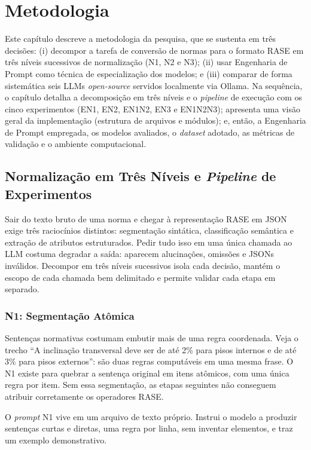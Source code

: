 \chapter{Metodologia}

Este capítulo descreve a metodologia da pesquisa, que se sustenta em três decisões: (i) decompor a tarefa de conversão de normas para o formato RASE em três níveis sucessivos de normalização (N1, N2 e N3); (ii) usar Engenharia de Prompt como técnica de especialização dos modelos; e (iii) comparar de forma sistemática seis LLMs \textit{open-source} servidos localmente via Ollama. Na sequência, o capítulo detalha a decomposição em três níveis e o \textit{pipeline} de execução com os cinco experimentos (EN1, EN2, EN1N2, EN3 e EN1N2N3); apresenta uma visão geral da implementação (estrutura de arquivos e módulos); e, então, a Engenharia de Prompt empregada, os modelos avaliados, o \textit{dataset} adotado, as métricas de validação e o ambiente computacional.

\section{Normalização em Três Níveis e \textit{Pipeline} de Experimentos}

Sair do texto bruto de uma norma e chegar à representação RASE em JSON exige três raciocínios distintos: segmentação sintática, classificação semântica e extração de atributos estruturados. Pedir tudo isso em uma única chamada ao LLM costuma degradar a saída: aparecem alucinações, omissões e JSONs inválidos. Decompor em três níveis sucessivos isola cada decisão, mantém o escopo de cada chamada bem delimitado e permite validar cada etapa em separado.

\subsection{N1: Segmentação Atômica}

Sentenças normativas costumam embutir mais de uma regra coordenada. Veja o trecho ``A inclinação transversal deve ser de até 2\% para pisos internos e de até 3\% para pisos externos'': são duas regras computáveis em uma mesma frase. O N1 existe para quebrar a sentença original em itens atômicos, com uma única regra por item. Sem essa segmentação, as etapas seguintes não conseguem atribuir corretamente os operadores RASE.

O \textit{prompt} N1 vive em um arquivo de texto próprio. Instrui o modelo a produzir sentenças curtas e diretas, uma regra por linha, sem inventar elementos, e traz um exemplo demonstrativo.

